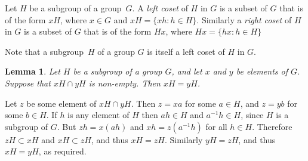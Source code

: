 \newtheorem{theorem}{Theorem}[section]
\newtheorem{lemma}[theorem]{Lemma}
\newtheorem{proposition}[theorem]{Proposition}
\newtheorem{corollary}[theorem]{Corollary}

\newenvironment{proof}[1][Proof]{\begin{trivlist}
\item[\hskip \labelsep {\bfseries #1}]}{\end{trivlist}}
\newenvironment{definition}[1][Definition]{\begin{trivlist}
\item[\hskip \labelsep {\bfseries #1}]}{\end{trivlist}}
\newenvironment{example}[1][Example]{\begin{trivlist}
\item[\hskip \labelsep {\bfseries #1}]}{\end{trivlist}}
\newenvironment{remark}[1][Remark]{\begin{trivlist}
\item[\hskip \labelsep {\bfseries #1}]}{\end{trivlist}}

\newcommand{\qed}{\nobreak \ifvmode \relax \else
      \ifdim\lastskip<1.5em \hskip-\lastskip
      \hskip1.5em plus0em minus0.5em \fi \nobreak
      \vrule height0.75em width0.5em depth0.25em\fi}


\begin{definition}
Let $H$ be a subgroup of a group~$G$.  A \emph{left coset}
of $H$ in $G$ is a subset of $G$ that is of the form $xH$,
where $x \in G$ and $xH = \{ xh : h \in H \}$.
Similarly a \emph{right coset} of $H$ in $G$ is a subset
of $G$ that is of the form $Hx$, where
$Hx = \{ hx : h \in H \}$
\end{definition}

Note that a subgroup~$H$ of a group $G$ is itself a
left coset of $H$ in $G$.

\begin{lemma}
\label{LeftCosetsDisjoint}
Let $H$ be a subgroup of a group $G$, and let $x$ and $y$ be
elements of $G$.  Suppose that $xH \cap yH$ is non-empty.
Then $xH = yH$.
\end{lemma}

\begin{proof}
Let $z$ be some element of $xH \cap yH$.  Then $z = xa$
for some $a \in H$, and $z = yb$ for some $b \in H$.
If $h$ is any element of $H$ then $ah \in H$ and
$a^{-1}h \in H$, since $H$ is a subgroup of $G$.
But $zh = x(ah)$ and $xh = z(a^{-1}h)$ for all $h \in H$.
Therefore $zH \subset xH$ and $xH \subset zH$, and thus
$xH = zH$.  Similarly $yH = zH$, and thus $xH = yH$,
as required.\qed
\end{proof}

